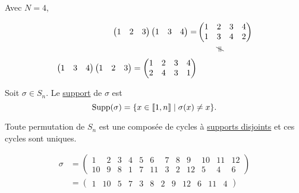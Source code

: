 \begin{exm}
	Avec $N=4$,
	
	\begin{align*}
		\begin{pmatrix}
			1&2&3
		\end{pmatrix} \begin{pmatrix}
			1&3&4
		\end{pmatrix} = &\begin{pmatrix}
			1&2&3&4\\
			1&3&4&2
		\end{pmatrix} \\
		&~~~~~~~\vrt{\neq}\\
		\begin{pmatrix}
			1&3&4
		\end{pmatrix} \begin{pmatrix}
			1&2&3
		\end{pmatrix} = \begin{pmatrix}
			1&2&3&4\\
			2&4&3&1
		\end{pmatrix} 
	\end{align*}
\end{exm}

\begin{defn}
	Soit $\sigma \in S_n$. Le \underline{support} de $\sigma$ est \[
		\operatorname{Supp}(\sigma) = \{x \in \left\llbracket 1,n \right\rrbracket  \mid  \sigma(x) \neq x\}. 
	\]
\end{defn}

\begin{thm}
	Toute permutation de $S_n$ est une composée de cycles à \underline{supports disjoints} et ces cycles sont uniques.
\end{thm}

\begin{exm}
	\begin{align*}
		\sigma &= \left(\begin{array}{cccccccccccc}
			1&2&3&4&5&6&7&8&9&10&11&12\\
			10&9&8&1&7&11&3&2&12&5&4&6
		\end{array}\right)\\
		&= \left(\begin{array}{cccccccccccc}
			1&10&5&7&3&8&2&9&12&6&11&4
		\end{array}\right) \\
	\end{align*}
\end{exm}

